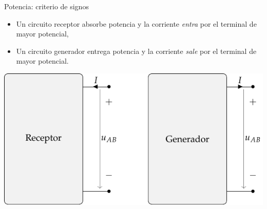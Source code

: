 \documentclass[aspectratio=169, usenames,svgnames,dvipsnames]{beamer}
\begin{document}
\begin{frame}[label={sec:org043f3ef}]{Potencia: criterio de signos}
\begin{itemize}
\item Un \alert{circuito receptor absorbe potencia} y la corriente \emph{entra} por el terminal de mayor potencial,
\item Un \alert{circuito generador entrega potencia} y la corriente \emph{sale} por el terminal de mayor potencial.
\end{itemize}

\begin{center}
\includegraphics[height=0.5\textheight]{../figs/receptor_generador.pdf}
\end{center}
\end{frame}
\end{document}
